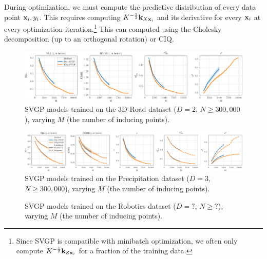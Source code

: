 During optimization, we must compute the predictive distribution of every data point $\mathbf{x}_i, y_i$.
This requires computing $K^{- \frac 1 2} \mathbf{k}_{X \mathbf{x}_i}$ and its derivative for every $\mathbf{x}_i$ at every optimization iteration.\footnote{
  Since SVGP is compatible with minibatch optimization, we often only compute $K^{- \frac 1 2} \mathbf{k}_{Z \mathbf{x}_i}$ for a fraction of the training data.
}
This can computed using the Cholesky decomposition (up to an orthogonal rotation) or CIQ.


\begin{figure}[t!]
  \centering
  \includegraphics[width=\linewidth]{figures/3droad.pdf}
  \caption{
    SVGP models trained on the 3D-Road dataset ($D=2$, $N\geq300,\!000$), varying $M$ (the number of inducing points).
  }
  \label{fig:3droad}
\end{figure}

\begin{figure}[t!]
  \centering
  \includegraphics[width=\linewidth]{figures/precip.pdf}
  \caption{
    SVGP models trained on the Precipitation dataset ($D=3$, $N\geq300,\!000$), varying $M$ (the number of inducing points).
  }
  \label{fig:precip}
\end{figure}

\begin{figure}[t!]
  \centering
  \caption{
    SVGP models trained on the Robotics dataset ($D=?$, $N\geq?$), varying $M$ (the number of inducing points).
  }
  \label{fig:robotics}
\end{figure}
